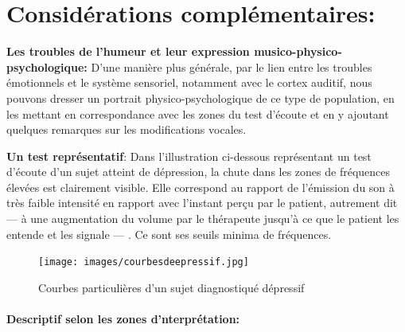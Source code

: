       \section{Considérations complémentaires:}


 \textbf{Les troubles de l'humeur et leur expression
    musico-phy\-sico-psy\-cho\-lo\-gi\-que:}
  D'une manière plus générale, par le lien entre les troubles
 émotionnels et le
système sensoriel, notamment avec le cortex auditif, nous
pouvons dresser un portrait
physico-psychologique de ce type de population,
  en les mettant en correspondance avec les zones du test d'écoute et
  en y ajoutant quelques remarques sur les modifications vocales.

  \textbf{Un test représentatif}:
Dans l'illustration ci-dessous représentant un test
d'écoute d'un sujet atteint de dépression, la
chute dans les zones de fréquences élevées est
clairement visible. Elle correspond au rapport de l'émission du son à
très faible intensité en rapport avec
l'instant perçu par le
patient, autrement dit  ---  à une augmentation
du volume
par le thérapeute jusqu'à ce que le patient les entende et les signale
--- .
Ce sont ses seuils minima de fréquences.
 \begin{figure}[ht]
	\centering
	\texttt{[image: images/courbesdeepressif.jpg]}
	\caption{Courbes particulières d'un sujet diagnostiqué dépressif}
	\label{fig:courbes du dépressif}
      \end{figure}




      \paragraph{Descriptif selon les zones d'nterprétation:}

